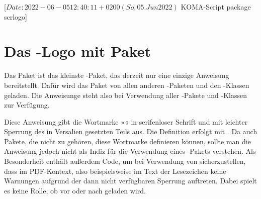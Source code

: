 %
%
%
%
%
%
%

                 [$Date: 2022-06-05 12:40:11 +0200 (So, 05. Jun 2022) $
                  KOMA-Script package scrlogo]

\chapter{Das \KOMAScript-Logo mit Paket }
\BeginIndexGroup
{}%

Das Paket  ist das kleinste \KOMAScript-Paket, das derzeit
nur eine einzige Anweisung bereitstellt. Dafür wird das Paket von allen anderen
\KOMAScript-Paketen und den \KOMAScript-Klassen geladen. Die Anweisunge steht
also bei Verwendung aller \KOMAScript-Pakete und \KOMAScript-Klassen zur
Verfügung.

\begin{Declaration}
\end{Declaration}
Diese Anweisung gibt die Wortmarke »\KOMAScript« in serifenloser Schrift und
mit leichter Sperrung des in Versalien gesetzten Teils aus. Die Definition
erfolgt mit . Da auch Pakete, die nicht zu
\KOMAScript{} gehören, diese Wortmarke definieren können, sollte man die
Anweisung jedoch nicht als Indiz für die Verwendung eines \KOMAScript-Pakets
verstehen. Als Besonderheit enthält
 außerdem Code, um bei Verwendung von
sicherzustellen, dass im PDF-Kontext, also beispielsweise im Text der
Lesezeichen keine Warnungen aufgrund der dann nicht verfügbaren Sperrung
auftreten. Dabei spielt es keine Rolle, ob  vor oder nach
 geladen wird.%
\EndIndexGroup
\EndIndexGroup
\endinput
                  
